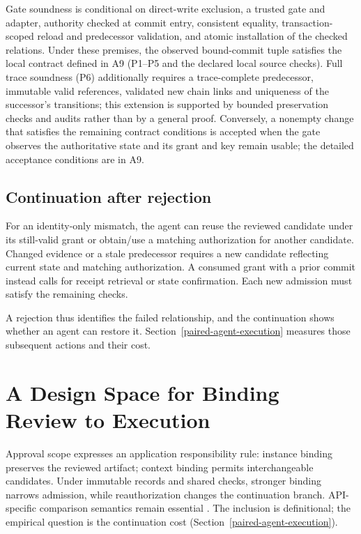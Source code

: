 \documentclass[pdflatex,sn-basic]{sn-jnl}
\begin{document}
Gate soundness is conditional on direct-write exclusion, a trusted gate and adapter, authority checked at commit entry, consistent equality, transaction-scoped reload and predecessor validation, and atomic installation of the checked relations. Under these premises, the observed bound-commit tuple satisfies the local contract defined in A9 (P1--P5 and the declared local source checks). Full trace soundness (P6) additionally requires a trace-complete predecessor, immutable valid references, validated new chain links and uniqueness of the successor's transitions; this extension is supported by bounded preservation checks and audits rather than by a general proof. Conversely, a nonempty change that satisfies the remaining contract conditions is accepted when the gate observes the authoritative state and its grant and key remain usable; the detailed acceptance conditions are in A9.

\subsection{Continuation after rejection}\label{continuation-after-rejection}

For an identity-only mismatch, the agent can reuse the reviewed candidate under its still-valid grant or obtain/use a matching authorization for another candidate. Changed evidence or a stale predecessor requires a new candidate reflecting current state and matching authorization. A consumed grant with a prior commit instead calls for receipt retrieval or state confirmation. Each new admission must satisfy the remaining checks.

A rejection thus identifies the failed relationship, and the continuation shows whether an agent can restore it. Section~\ref{paired-agent-execution} measures those subsequent actions and their cost.

\section{A Design Space for Binding Review to Execution}\label{design-space}

Approval scope expresses an application responsibility rule: instance binding preserves the reviewed artifact; context binding permits interchangeable candidates. Under immutable records and shared checks, stronger binding narrows admission, while reauthorization changes the continuation branch. API-specific comparison semantics remain essential \citep{rfc9396}. The inclusion is definitional; the empirical question is the continuation cost (Section~\ref{paired-agent-execution}).
\end{document}
